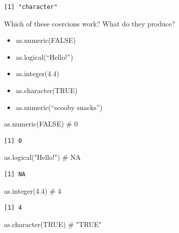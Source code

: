 \documentclass[
  letterpaper,
  DIV=11,
  numbers=noendperiod]{scrartcl}
\newenvironment{Shaded}{\begin{snugshade}}{\end{snugshade}}
\newcommand{\CommentTok}[1]{\textcolor[rgb]{0.37,0.37,0.37}{#1}}
\newcommand{\ConstantTok}[1]{\textcolor[rgb]{0.56,0.35,0.01}{#1}}
\newcommand{\FloatTok}[1]{\textcolor[rgb]{0.68,0.00,0.00}{#1}}
\newcommand{\FunctionTok}[1]{\textcolor[rgb]{0.28,0.35,0.67}{#1}}
\newcommand{\NormalTok}[1]{\textcolor[rgb]{0.00,0.23,0.31}{#1}}
\newcommand{\StringTok}[1]{\textcolor[rgb]{0.13,0.47,0.30}{#1}}
\begin{document}
\begin{verbatim}
[1] "character"
\end{verbatim}

Which of these coercions work? What do they produce?

\begin{itemize}
\item
  as.numeric(FALSE)
\item
  as.logical(``Hello!'')
\item
  as.integer(4.4)
\item
  as.character(TRUE)
\item
  as.numeric(``scooby snacks'')
\end{itemize}

\begin{Shaded}
\begin{Highlighting}[]
\FunctionTok{as.numeric}\NormalTok{(}\ConstantTok{FALSE}\NormalTok{) }\CommentTok{\# 0}
\end{Highlighting}
\end{Shaded}

\begin{verbatim}
[1] 0
\end{verbatim}

\begin{Shaded}
\begin{Highlighting}[]
\FunctionTok{as.logical}\NormalTok{(}\StringTok{"Hello!"}\NormalTok{) }\CommentTok{\# NA}
\end{Highlighting}
\end{Shaded}

\begin{verbatim}
[1] NA
\end{verbatim}

\begin{Shaded}
\begin{Highlighting}[]
\FunctionTok{as.integer}\NormalTok{(}\FloatTok{4.4}\NormalTok{) }\CommentTok{\# 4}
\end{Highlighting}
\end{Shaded}

\begin{verbatim}
[1] 4
\end{verbatim}

\begin{Shaded}
\begin{Highlighting}[]
\FunctionTok{as.character}\NormalTok{(}\ConstantTok{TRUE}\NormalTok{) }\CommentTok{\# "TRUE"}
\end{Highlighting}
\end{Shaded}
\end{document}
